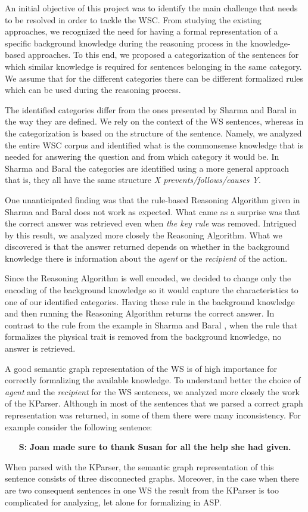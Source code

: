 An initial objective of this project was to identify the main challenge that needs to be resolved in order to tackle the WSC.
From studying the existing approaches, we recognized the need for having a formal representation of a specific background knowledge during the reasoning process in the knowledge-based approaches. To this end, we proposed a categorization of the sentences for which similar knowledge is required for sentences belonging in the same category. We assume that for the different categories there can be different formalized rules which can be used during the reasoning process. 


The identified categories differ from the ones presented by Sharma and Baral \cite{2018CommonsenseKT} in the way they are defined. We rely on the context of the WS sentences, whereas in \cite{2018CommonsenseKT} the categorization is based on the structure of the sentence. Namely, we analyzed the entire WSC corpus and identified what is the commonsense knowledge that is needed for answering the question and from which category it would be. In Sharma and Baral \cite{2018CommonsenseKT} the categories are identified using a more general approach that is, they all have the same structure \textit{X prevents/follows/causes Y}. 

One unanticipated finding was that the rule-based Reasoning Algorithm given in Sharma and Baral \cite{2018CommonsenseKT} does not work as expected.  What came as a surprise was that the correct answer was retrieved even when \textit{the key rule} was removed.  
Intrigued by this result, we analyzed more closely the Reasoning Algorithm. What we discovered is that the answer returned depends on whether in the background knowledge there is information about the \textit{agent} or the \textit{recipient} of the action. 

Since the Reasoning Algorithm is well encoded, we decided to change only the encoding of the background knowledge so it would capture the characteristics to one of our identified categories. 
Having these rule in the background knowledge and then running the Reasoning Algorithm returns the correct answer. In contrast to the rule from the example in Sharma and Baral \cite{2018CommonsenseKT}, when the rule that formalizes the physical trait is removed from the background knowledge, no answer is retrieved. 

A good semantic graph representation of the WS is of high importance for correctly formalizing the available knowledge. To understand better the choice of \textit{agent} and the \textit{recipient} for the WS sentences, we analyzed more closely the work of the KParser. Although in most of the sentences that we parsed a correct graph representation was returned, in some of them there were many inconsistency. For example consider the following sentence:
\begin{itemize}
	\item[\textbf{S:}] \textbf{Joan made sure to thank Susan for all the help she had given.}
\end{itemize}

When parsed with the KParser, the semantic graph representation of this sentence consists of three disconnected graphs. Moreover, in the case when there are two consequent sentences in one WS the result from the KParser is too complicated for analyzing, let alone for formalizing in ASP. 



